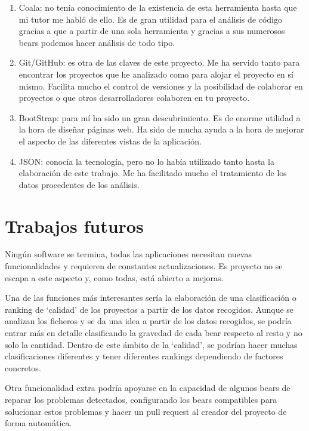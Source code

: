 \documentclass[a4paper, 12pt]{book}
\begin{document}
\begin{enumerate}
  \item Coala: no tenía conocimiento de la existencia de esta herramienta hasta que mi tutor me habló de ello. Es de gran utilidad para el análisis de código gracias a que a partir de una sola herramienta y gracias a sus numerosos bears podemos hacer análisis de todo tipo.
  \item Git/GitHub: es otra de las claves de este proyecto. Me ha servido tanto para encontrar los proyectos que he analizado como para alojar el proyecto en sí mismo. Facilita mucho el control de versiones y la posibilidad de colaborar en proyectos o que otros desarrolladores colaboren en tu proyecto.
  \item BootStrap: para mí ha sido un gran descubrimiento. Es de enorme utilidad a la hora de diseñar páginas web. Ha sido de mucha ayuda a la hora de mejorar el aspecto de las diferentes vistas de la aplicación.
  \item JSON: conocía la tecnología, pero no lo había utilizado tanto hasta la elaboración de este trabajo. Me ha facilitado mucho el tratamiento de los datos procedentes de los análisis.
\end{enumerate}


\section{Trabajos futuros}
\label{sec:trabajos_futuros}
Ningún software se termina, todas las aplicaciones necesitan nuevas funcionalidades y requieren de constantes actualizaciones. Es proyecto no se escapa a este aspecto y, como todas, está abierto a mejoras.

Una de las funciones más interesantes sería la elaboración de una clasificación o ranking de `calidad' de los proyectos a partir de los datos recogidos. Aunque se analizan los ficheros y se da una idea a partir de los datos recogidos, se podría entrar más en detalle clasificando la gravedad de cada bear respecto al resto y no solo la cantidad. Dentro de este ámbito de la `calidad', se podrían hacer muchas clasificaciones diferentes y tener diferentes rankings dependiendo de factores concretos.

Otra funcionalidad extra podría apoyarse en la capacidad de algunos bears de reparar los problemas detectados, configurando los bears compatibles para solucionar estos problemas y hacer un pull request al creador del proyecto de forma automática.

\end{document}

